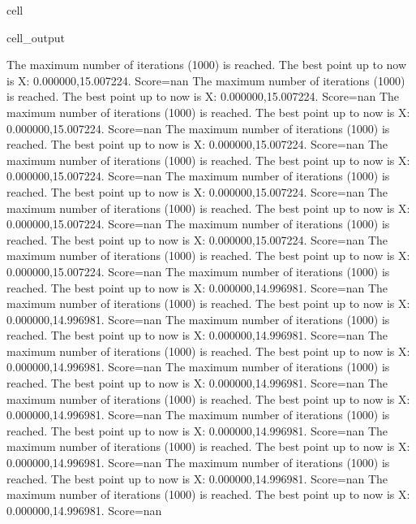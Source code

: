 \documentclass[letterpaper,10pt,english]{jupyterBook}
\begin{document}
\begin{sphinxuseclass}{cell}
\begin{sphinxVerbatimOutput}
\begin{sphinxuseclass}{cell_output}
\begin{sphinxVerbatim}[commandchars=\\\{\}]
The maximum number of iterations (1000) is reached. The best point up to now is X: \PYGZob{}0.000000,15.007224\PYGZcb{}. Score=\PYGZhy{}nan
The maximum number of iterations (1000) is reached. The best point up to now is X: \PYGZob{}0.000000,15.007224\PYGZcb{}. Score=\PYGZhy{}nan
The maximum number of iterations (1000) is reached. The best point up to now is X: \PYGZob{}0.000000,15.007224\PYGZcb{}. Score=\PYGZhy{}nan
The maximum number of iterations (1000) is reached. The best point up to now is X: \PYGZob{}0.000000,15.007224\PYGZcb{}. Score=\PYGZhy{}nan
The maximum number of iterations (1000) is reached. The best point up to now is X: \PYGZob{}0.000000,15.007224\PYGZcb{}. Score=\PYGZhy{}nan
The maximum number of iterations (1000) is reached. The best point up to now is X: \PYGZob{}0.000000,15.007224\PYGZcb{}. Score=\PYGZhy{}nan
The maximum number of iterations (1000) is reached. The best point up to now is X: \PYGZob{}0.000000,15.007224\PYGZcb{}. Score=\PYGZhy{}nan
The maximum number of iterations (1000) is reached. The best point up to now is X: \PYGZob{}0.000000,15.007224\PYGZcb{}. Score=\PYGZhy{}nan
The maximum number of iterations (1000) is reached. The best point up to now is X: \PYGZob{}0.000000,15.007224\PYGZcb{}. Score=\PYGZhy{}nan
The maximum number of iterations (1000) is reached. The best point up to now is X: \PYGZob{}0.000000,14.996981\PYGZcb{}. Score=\PYGZhy{}nan
The maximum number of iterations (1000) is reached. The best point up to now is X: \PYGZob{}0.000000,14.996981\PYGZcb{}. Score=\PYGZhy{}nan
The maximum number of iterations (1000) is reached. The best point up to now is X: \PYGZob{}0.000000,14.996981\PYGZcb{}. Score=\PYGZhy{}nan
The maximum number of iterations (1000) is reached. The best point up to now is X: \PYGZob{}0.000000,14.996981\PYGZcb{}. Score=\PYGZhy{}nan
The maximum number of iterations (1000) is reached. The best point up to now is X: \PYGZob{}0.000000,14.996981\PYGZcb{}. Score=\PYGZhy{}nan
The maximum number of iterations (1000) is reached. The best point up to now is X: \PYGZob{}0.000000,14.996981\PYGZcb{}. Score=\PYGZhy{}nan
The maximum number of iterations (1000) is reached. The best point up to now is X: \PYGZob{}0.000000,14.996981\PYGZcb{}. Score=\PYGZhy{}nan
The maximum number of iterations (1000) is reached. The best point up to now is X: \PYGZob{}0.000000,14.996981\PYGZcb{}. Score=\PYGZhy{}nan
The maximum number of iterations (1000) is reached. The best point up to now is X: \PYGZob{}0.000000,14.996981\PYGZcb{}. Score=\PYGZhy{}nan
The maximum number of iterations (1000) is reached. The best point up to now is X: \PYGZob{}0.000000,14.996981\PYGZcb{}. Score=\PYGZhy{}nan

\end{sphinxVerbatim}
\end{sphinxuseclass}
\end{sphinxVerbatimOutput}
\end{sphinxuseclass}
\end{document}
